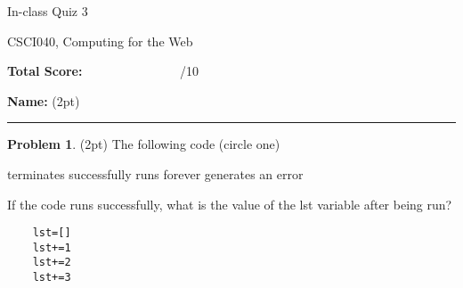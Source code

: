 \documentclass[10pt]{article}
\theoremstyle{definition}
\newtheorem{problem}{Problem}
\begin{document}
\begin{center}
    {
\Large
In-class Quiz 3 
}

    \vspace{0.1in}
CSCI040, Computing for the Web

    \vspace{0.1in}
\end{center}

\vspace{0.25in}
\noindent
\textbf{Total Score:} ~~~~~~~~~~~~~~~/10

\vspace{0.5in}
\noindent
\textbf{Name:} (2pt)

\noindent
\rule{\textwidth}{0.1pt}
\vspace{0.25in}

\begin{problem}
    (2pt)
    The following code (circle one)
    
    \vspace{0.25in}
    \hspace{0.5in}terminates successfully
    \hspace{1in}runs forever
    \hspace{1in}generates an error
    \vspace{0.25in}

    \noindent
    If the code runs successfully, what is the value of the lst variable after being run?
\end{problem}
\begin{lstlisting}
    lst=[]
    lst+=1
    lst+=2
    lst+=3
\end{lstlisting}
\vspace{1.5in}
\end{document}
